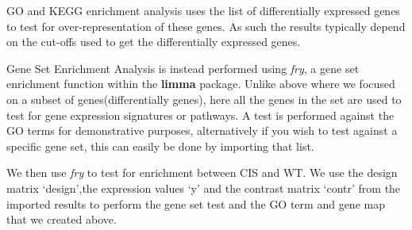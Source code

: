 \documentclass[]{book}
\newenvironment{Shaded}{\begin{snugshade}}{\end{snugshade}}
\newcommand{\DataTypeTok}[1]{\textcolor[rgb]{0.13,0.29,0.53}{#1}}
\newcommand{\KeywordTok}[1]{\textcolor[rgb]{0.13,0.29,0.53}{\textbf{#1}}}
\newcommand{\NormalTok}[1]{#1}
\newcommand{\OperatorTok}[1]{\textcolor[rgb]{0.81,0.36,0.00}{\textbf{#1}}}
\begin{document}
GO and KEGG enrichment analysis uses the list of differentially expressed genes to test for over-representation of these genes. As such the results typically depend on the cut-offs used to get the differentially expressed genes.

Gene Set Enrichment Analysis is instead performed using \emph{fry}, a gene set enrichment function within the \textbf{limma} package. Unlike above where we focused on a subset of genes(differentially genes), here all the genes in the set are used to test for gene expression signatures or pathways. A test is performed against the GO terms for demonstrative purposes, alternatively if you wish to test against a specific gene set, this can easily be done by importing that list.

We then use \emph{fry} to test for enrichment between CIS and WT. We use the design matrix `design',the expression values `y' and the contrast matrix `contr' from the imported results to perform the gene set test and the GO term and gene map that we created above.

\begin{Shaded}
\end{Shaded}
\end{document}
